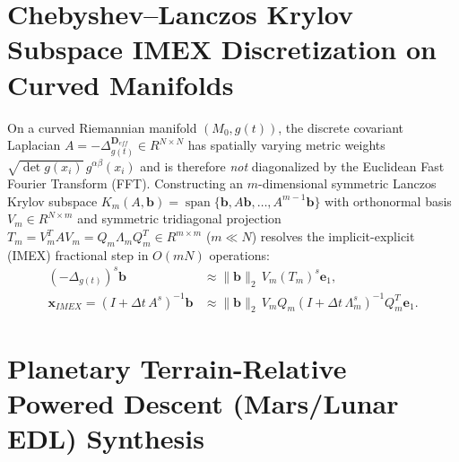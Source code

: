 \documentclass[11pt,a4paper,reqno]{article}
\def\mathrm#1{#1}%
\def\mathcal#1{#1}%
\def\mathbb#1{#1}%
\theoremstyle{plain}
\theoremstyle{definition}
\theoremstyle{remark}
\numberwithin{equation}{section}
\begin{document}
\section{Chebyshev--Lanczos Krylov Subspace IMEX Discretization on Curved Manifolds}
\label{sec:krylov_imex}

On a curved Riemannian manifold $(\mathcal{M}_0, g(t))$, the discrete covariant Laplacian $A = -\Delta_{g(t)}^{\mathbf{D}_{\mathrm{eff}}} \in \mathbb{R}^{N \times N}$ has spatially varying metric weights $\sqrt{\det g(x_i)}\,g^{\alpha\beta}(x_i)$ and is therefore \emph{not} diagonalized by the Euclidean Fast Fourier Transform (FFT). Constructing an $m$-dimensional symmetric Lanczos Krylov subspace $\mathcal{K}_m(A, \mathbf{b}) = \operatorname{span}\{\mathbf{b}, A\mathbf{b}, \dots, A^{m-1}\mathbf{b}\}$ \cite{saad1992analysis, higham2008functions} with orthonormal basis $V_m \in \mathbb{R}^{N \times m}$ and symmetric tridiagonal projection $T_m = V_m^T A V_m = Q_m \Lambda_m Q_m^T \in \mathbb{R}^{m \times m}$ ($m \ll N$) resolves the implicit-explicit (IMEX) fractional step in $\mathcal{O}(m N)$ operations:
\begin{align}\label{eq:krylov_imex}
  (-\Delta_{g(t)})^s \mathbf{b} &\approx \|\mathbf{b}\|_2\, V_m (T_m)^s \mathbf{e}_1, \nonumber \\
  \mathbf{x}_{\mathrm{IMEX}} = \left(I + \Delta t\,A^s\right)^{-1}\mathbf{b} &\approx \|\mathbf{b}\|_2\, V_m Q_m \left(I + \Delta t\,\Lambda_m^s\right)^{-1} Q_m^T \mathbf{e}_1.
\end{align}

\section{Planetary Terrain-Relative Powered Descent (Mars/Lunar EDL) Synthesis}
\label{sec:mars_edl}
\end{document}

